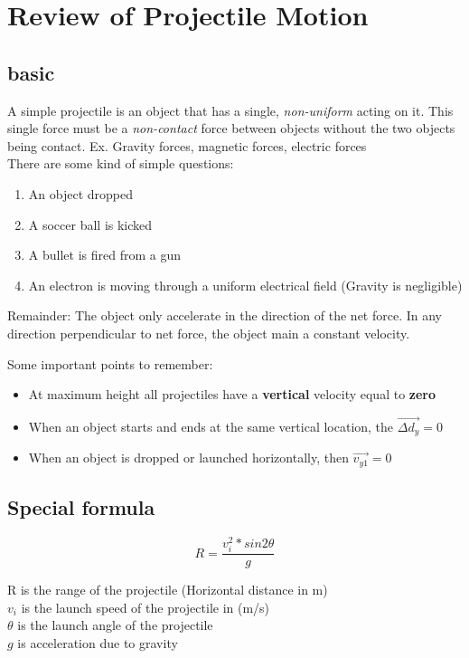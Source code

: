 \section{Review of Projectile Motion}
\subsection{basic}
A simple projectile is an object that has a single, \textit{non-uniform} acting on it. This single force must be a 
\textit{non-contact} force between objects without the two objects being contact. Ex. Gravity forces, magnetic forces,
electric forces \\

There are some kind of simple questions:
\begin{enumerate}
    \item An object dropped
    \item A soccer ball is kicked
    \item A bullet is fired from a gun 
    \item An electron is moving through a uniform electrical field (Gravity is negligible)
\end{enumerate}

Remainder: The object only accelerate in the direction of the net force. In any direction perpendicular to net force, 
the object main a constant velocity. 

Some important points to remember:
\begin{itemize}
    \item At maximum height all projectiles have a \textbf{vertical} velocity equal to \textbf{zero}
    \item When an object starts and ends at the same vertical location, the $\vec{\Delta d_{y}} = 0$
    \item When an object is dropped or launched horizontally, then $\vec{v_{y1}} = 0$
\end{itemize}

\subsection{Special formula}
\begin{equation} \label{eq:Special}
    R = \frac{ v_{i}^2 * sin{2\theta} }{g} 
\end{equation}
\begin{center}
    R is the range of the projectile (Horizontal distance in m) \\
    $v_{i}$ is the launch speed of the projectile in (m/s) \\
    $\theta$ is the launch angle of the projectile \\
    $g$ is acceleration due to gravity \\
\end{center}

